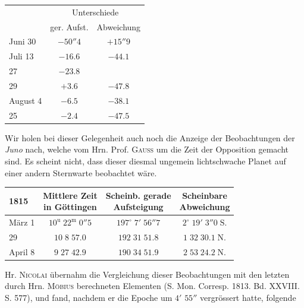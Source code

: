 \begin{center}
\fontsize{10}{12}\selectfont\setlength{\tabcolsep}{9pt}\renewcommand{\arraystretch}{1.15}\begin{tabular}{l | c | c}
& \multicolumn{2}{c}{Unterschiede} \\
& ger. Aufst. & Abweichung \\
\hline
Juni 30 & $-50''4$ & $+15''9$ \\
Juli 13 & $-16.6$ & $-44.1$ \\
27 & $-23.8$ & \\
29 & $+3.6$ & $-47.8$ \\
August 4 & $-6.5$ & $-38.1$ \\
25 & $-2.4$ & $-47.5$ \\
\end{tabular}
\end{center}

\par\indent Wir holen bei dieser Gelegenheit auch noch die Anzeige der Beobachtungen der \emph{Juno} nach,
welche vom Hrn. Prof. \textsc{Gauss} um die Zeit der Opposition gemacht sind. Es scheint nicht, dass dieser
diesmal ungemein lichtschwache Planet auf einer andern Sternwarte beobachtet wäre.

\begin{center}\fontsize{10}{12}\selectfont\setlength{\tabcolsep}{5pt}\renewcommand{\arraystretch}{1.15}\begin{tabular}{l|c|c|c}
1815 & \shortstack{Mittlere Zeit\\in Göttingen} & \shortstack{Scheinb. gerade\\Aufsteigung} & \shortstack{Scheinbare\\Abweichung}\\\hline
März 1 & $10^{\mathrm u}\;22^{\mathrm m}\;0''5$ & $197^\circ\;7'\;56''7$ & $2^\circ\;19'\;3''0\;\mathrm{S.}$\\
29 & $10\;8\;57.0$ & $192\;31\;51.8$ & $1\;32\;30.1\;\mathrm{N.}$\\
April 8 & $9\;27\;42.9$ & $190\;34\;51.9$ & $2\;53\;24.2\;\mathrm{N.}$\\
\end{tabular}\end{center}

\par\indent Hr. \textsc{Nicolai} übernahm die Vergleichung dieser Beobachtungen mit den letzten durch Hrn. \textsc{Möbius}
berechneten Elementen (S. Mon. Corresp. 1813. Bd. XXVIII. S. 577), und fand, nachdem er die Epoche
um $4'$ $55''$ vergrössert hatte, folgende

